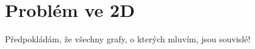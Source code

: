 \chapter{Problém ve 2D}
\label{chap:problem2d}
Předpokládám, že všechny grafy, o kterých mluvím, jsou souvislé!




